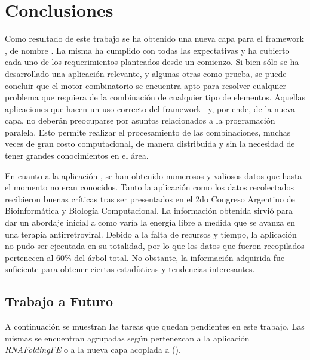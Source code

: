 \chapter{Conclusiones}
Como resultado de este trabajo se ha obtenido una nueva capa para el framework \fud, de nombre \combeng. La misma ha cumplido con todas las
expectativas y ha cubierto cada uno de los requerimientos planteados desde un comienzo. Si bien s\'olo se ha desarrollado una aplicaci\'on relevante,
y algunas otras como prueba, se puede concluir que el motor combinatorio se encuentra apto para resolver cualquier problema que requiera de
la combinaci\'on de cualquier tipo de elementos. Aquellas aplicaciones que hacen un uso correcto del framework \fud \ y, por ende, de la nueva capa,
no deber\'an preocuparse por asuntos relacionados a la programaci\'on paralela. Esto permite realizar el procesamiento de las
 combinaciones, muchas veces de gran costo computacional, de manera distribuida y sin la necesidad de tener grandes conocimientos en el \'area. 

En cuanto a la aplicaci\'on \rnaffe, se han obtenido numerosos y valiosos datos que hasta el momento no eran conocidos. Tanto la
aplicaci\'on como los datos recolectados recibieron buenas cr\'iticas tras ser presentados en el 2do Congreso Argentino de
Bioinform\'atica y Biolog\'ia Computacional. La informaci\'on obtenida sirvi\'o para dar un abordaje 
inicial a como var\'ia la energ\'ia libre a medida que se avanza en una terapia antirretroviral. Debido a la falta de recursos y tiempo,
 la aplicaci\'on no pudo ser ejecutada en su totalidad, por lo que los datos que fueron recopilados pertenecen al 60\% del \'arbol total. 
No obstante, la informaci\'on adquirida fue suficiente para obtener ciertas estad\'isticas y tendencias interesantes.
\newpage
\section{Trabajo a Futuro}
A continuaci\'on se muestran las tareas que quedan pendientes en este trabajo. Las mismas se encuentran agrupadas seg\'un pertenezcan a 
la aplicaci\'on \emph{RNAFoldingFE} o a la nueva capa acoplada a \fud (\combeng).

